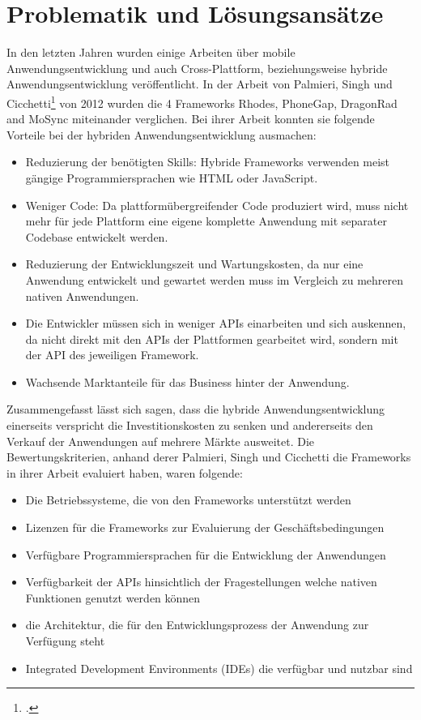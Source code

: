 \chapter{Problematik und Lösungsansätze}

In den letzten Jahren wurden einige Arbeiten über mobile Anwendungsentwicklung und auch Cross-Plattform, beziehungsweise hybride Anwendungsentwicklung veröffentlicht. In der Arbeit von Palmieri, Singh und Cicchetti\footcite{ComparisonCrossPlatMobDevTools} von 2012 wurden die 4 Frameworks Rhodes, PhoneGap, DragonRad and MoSync miteinander verglichen. Bei ihrer Arbeit konnten sie folgende Vorteile bei der hybriden Anwendungsentwicklung ausmachen: 

\begin{itemize}
\item Reduzierung der benötigten Skills: Hybride Frameworks verwenden meist gängige Programmiersprachen wie HTML oder JavaScript.
\item Weniger Code: Da plattformübergreifender Code produziert wird, muss nicht mehr für jede Plattform eine eigene komplette Anwendung mit separater Codebase entwickelt werden.
\item Reduzierung der Entwicklungszeit und Wartungskosten, da nur eine Anwendung entwickelt und gewartet werden muss im Vergleich zu mehreren nativen Anwendungen. 
\item Die Entwickler müssen sich in weniger APIs einarbeiten und sich auskennen, da nicht direkt mit den APIs der Plattformen gearbeitet wird, sondern mit der API des jeweiligen Framework.
\item Wachsende Marktanteile für das Business hinter der Anwendung. 
\end{itemize}

Zusammengefasst lässt sich sagen, dass die hybride Anwendungsentwicklung einerseits verspricht die Investitionskosten zu senken und andererseits den Verkauf der Anwendungen auf mehrere Märkte ausweitet. Die Bewertungskriterien, anhand derer Palmieri, Singh und Cicchetti die Frameworks in ihrer Arbeit evaluiert haben, waren folgende: 

\begin{itemize}
\item Die Betriebssysteme, die von den Frameworks unterstützt werden
\item Lizenzen für die Frameworks zur Evaluierung der Geschäftsbedingungen
\item Verfügbare Programmiersprachen für die Entwicklung der Anwendungen
\item Verfügbarkeit der APIs hinsichtlich der Fragestellungen welche nativen Funktionen genutzt werden können
\item die Architektur, die für den Entwicklungsprozess der Anwendung zur Verfügung steht
\item Integrated Development Environments (IDEs) die verfügbar und nutzbar sind
\end{itemize}

